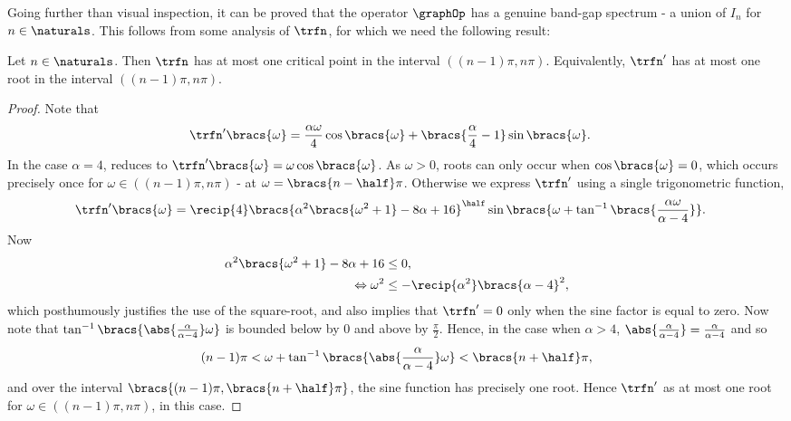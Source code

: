 Going further than visual inspection, it can be proved that the operator $\graphOp$ has a genuine band-gap spectrum - a union of  $I_{n}$ for $n\in\naturals$.
This follows from some analysis of $\trfn$, for which we need the following result:
\begin{lemma} \label{lem:CritPtsOmega}
	Let $n\in\naturals$. Then $\trfn$ has at most one critical point in the interval $((n-1)\pi, n\pi)$. \newline
	Equivalently, $\trfn^{\prime}$ has at most one root in the interval $((n-1)\pi, n\pi)$.
\end{lemma}
\begin{proof}
	Note that
	\begin{align} \label{eq:OmegaPrimeEqn}
		\trfn^{\prime}\bracs{\omega} &= \frac{\alpha\omega}{4}\cos\bracs{\omega} + \bracs{\frac{\alpha}{4} - 1}\sin\bracs{\omega}.
	\end{align}
	In the case $\alpha=4$,  reduces to $\trfn^{\prime}\bracs{\omega} = \omega\cos\bracs{\omega}$. 
	As $\omega>0$, roots can only occur when $\cos\bracs{\omega}=0$, which occurs precisely once for $\omega\in((n-1)\pi, n\pi)$ - at $\omega=\bracs{n-\half}\pi$. \newline
	Otherwise we express $\trfn^{\prime}$ using a single trigonometric function,
	\begin{align} \label{eq:OmegaPrimeAlt}
		\trfn^{\prime}\bracs{\omega} &= \recip{4}\bracs{\alpha^{2}\bracs{\omega^{2}+1}-8\alpha+16}^{\half}\sin\bracs{\omega + \tan^{-1}\bracs{\frac{\alpha\omega}{\alpha-4}}}.
	\end{align}
	Now
	\begin{align*}
		\alpha^{2}\bracs{\omega^{2}+1}-8\alpha+16 &\leq 0, \\
		\Leftrightarrow \omega^{2} &\leq -\recip{\alpha^{2}}\bracs{\alpha-4}^{2},
	\end{align*}
	which posthumously justifies the use of the square-root, and also implies that $\trfn^{\prime}=0$ only when the sine factor is equal to zero.
	Now note that $\tan^{-1}\bracs{\abs{\frac{\alpha}{\alpha-4}}\omega}$ is bounded below by $0$ and above by $\frac{\pi}{2}$.
	Hence, in the case when $\alpha>4$, $\abs{\frac{\alpha}{\alpha-4}}=\frac{\alpha}{\alpha-4}$ and so
	\begin{align*}
		(n-1)\pi &< \omega + \tan^{-1}\bracs{\abs{\frac{\alpha}{\alpha-4}}\omega} < \bracs{n+\half}\pi, \\
	\end{align*}
	and over the interval $\bracs{(n-1)\pi, \bracs{n+\half}\pi}$, the sine function has precisely one root. Hence $\trfn^{\prime}$ as at most one root for $\omega\in((n-1)\pi,n\pi)$, in this case.

\end{proof}
